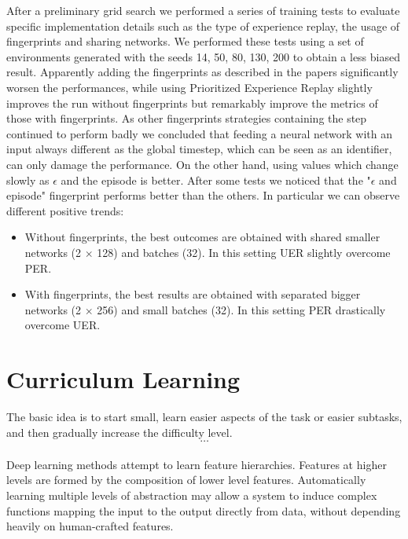 \documentclass[11pt, a4paper, hidelinks]{report}
\begin{document}
After a preliminary grid search we performed a series of training tests to evaluate specific implementation details such as the type of experience replay, the usage of fingerprints and sharing networks.
We performed these tests using a set of environments generated with the seeds 14, 50, 80, 130, 200 to obtain a less biased result.
Apparently adding the fingerprints as described in the papers significantly worsen the performances, while using Prioritized Experience Replay slightly improves the run without fingerprints but remarkably improve the metrics of those with fingerprints.
As other fingerprints strategies containing the step continued to perform badly we concluded that feeding a neural network with an input always different as the global timestep, which can be seen as an identifier, can only damage the performance.
On the other hand, using values which change slowly as $\epsilon$ and the episode is better.
After some tests we noticed that the "$\epsilon$ and episode" fingerprint performs better than the others.
In particular we can observe different positive trends:
\begin{itemize}
	\item Without fingerprints, the best outcomes are obtained with shared smaller networks (2 $\times$ 128) and batches (32).
In this setting UER slightly overcome PER\@.
	\item With fingerprints, the best results are obtained with separated bigger networks (2 $\times$ 256) and small batches (32).
In this setting PER drastically overcome UER\@.
\end{itemize}

\section{Curriculum Learning}\label{sec:curriculum-learning}

\begin{quoting}[font=itshape, begintext={"}, endtext={"\citep{bengio-curiculum}}]
The basic idea is to start small, learn easier aspects of the task or easier subtasks, and then gradually increase the difficulty level.\\
\[\dots\]\\
Deep learning methods attempt to learn feature hierarchies.
Features at higher levels are formed by the composition of lower level features.
Automatically learning multiple levels of abstraction may allow a system to induce complex functions mapping the input to the output directly from data, without depending heavily on human-crafted features.
\end{quoting}
\end{document}
